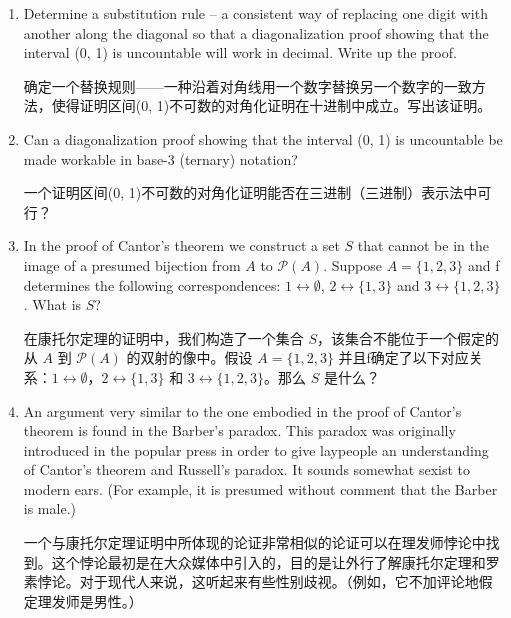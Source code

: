 \begin{enumerate}
    \item Determine a substitution rule -- a consistent way of replacing one digit
    with another along the diagonal so that a diagonalization proof showing
    that the interval (0, 1) is uncountable will work in decimal.
    Write up
    the proof.
    
    确定一个替换规则——一种沿着对角线用一个数字替换另一个数字的一致方法，使得证明区间(0, 1)不可数的对角化证明在十进制中成立。写出该证明。
    
    \wbvfill
    
    \item Can a diagonalization proof showing that the interval (0, 1) is uncountable
    be made workable in base-3 (ternary) notation?
    
    一个证明区间(0, 1)不可数的对角化证明能否在三进制（三进制）表示法中可行？
    \wbvfill
    
    \workbookpagebreak
    
    \item In the proof of Cantor's theorem we construct a set $S$ that cannot
    be in the image of a presumed bijection from $A$ to ${\mathcal P}(A)$.
    Suppose $A = \{1, 2, 3\}$ and f determines the following correspondences: 
    $1 \longleftrightarrow \emptyset$,
    $2 \longleftrightarrow \{1, 3\}$ and $3 \longleftrightarrow \{1, 2, 3\}$.
    What is $S$?
    
    在康托尔定理的证明中，我们构造了一个集合 $S$，该集合不能位于一个假定的从 $A$ 到 ${\mathcal P}(A)$ 的双射的像中。假设 $A = \{1, 2, 3\}$ 并且f确定了以下对应关系：$1 \longleftrightarrow \emptyset$，$2 \longleftrightarrow \{1, 3\}$ 和 $3 \longleftrightarrow \{1, 2, 3\}$。那么 $S$ 是什么？
    
    \wbvfill
    
    \item An argument very similar to the one embodied in the proof of Cantor's
    theorem is found in the Barber's paradox.
    This paradox was
    originally introduced in the popular press in order to give laypeople an
    understanding of Cantor's theorem and Russell's paradox.
    It sounds
    somewhat sexist to modern ears.  (For example, it is presumed without
    comment that the Barber is male.)
    
    一个与康托尔定理证明中所体现的论证非常相似的论证可以在理发师悖论中找到。这个悖论最初是在大众媒体中引入的，目的是让外行了解康托尔定理和罗素悖论。对于现代人来说，这听起来有些性别歧视。（例如，它不加评论地假定理发师是男性。）
    

\end{enumerate}
